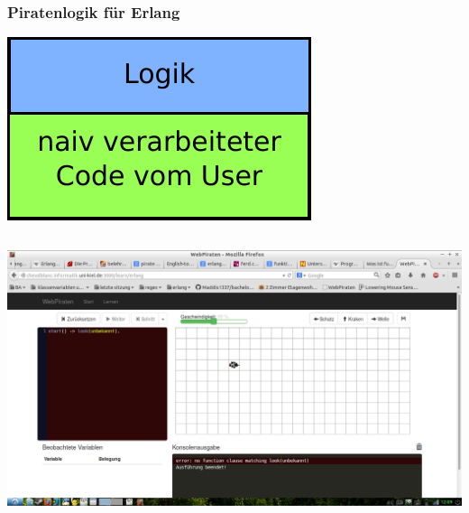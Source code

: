 \begin{frame}
\frametitle{Piratenlogik für Erlang}
\begin{center}

    \includegraphics[scale=1.0]{erlang/pics/ErlangVerarbeitungB}

\end{center}    

\end{frame}

\begin{frame}
\inputminted[linenos, frame=lines, tabsize=2, fontsize=\footnotesize  ]{erlang}{erlang/Beispiel.erl}
\begin{center}
 
\end{center}
\end{frame}


\begin{frame}

\begin{center}
  \includegraphics[scale=0.2]{erlang/pics/clauseerror.png}
\end{center}
\end{frame}

